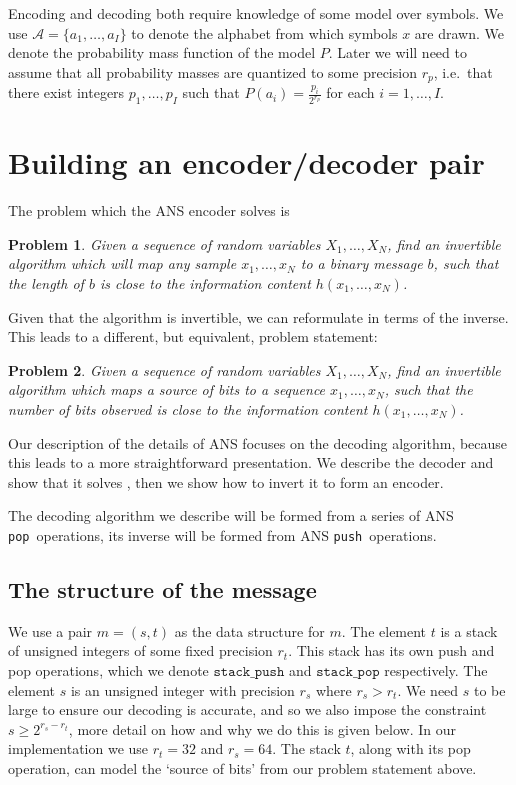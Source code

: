 \documentclass{article}
\newtheorem{problem}{Problem}
\newcommand{\push}{\texttt{push}}
\newcommand{\pop}{\texttt{pop}}
\begin{document}
Encoding and decoding both require knowledge of some model over symbols. We use
$\mathcal{A} = \{a_1, \ldots, a_I\}$ to denote the alphabet from which symbols
$x$ are drawn. We denote the probability mass function of the model $P$. Later
we will need to assume that all probability masses are quantized to some
precision $r_p$, i.e.\ that there exist integers $p_1, \ldots, p_I$ such that
$P(a_i) = \frac{p_i}{2^{r_p}}$ for each $i = 1,\ldots,I$.

\section{Building an encoder/decoder pair}
The problem which the ANS encoder solves is

\begin{problem}\label{prob:default}
  Given a sequence of random variables $X_1, \ldots, X_N$, find an invertible
  algorithm which will map any sample $x_1, \ldots, x_N$ to a binary message
  $b$, such that the length of $b$ is close to the information content $h(x_1,
  \ldots, x_N)$.
\end{problem}

Given that the algorithm is invertible, we can reformulate 
in terms of the inverse. This leads to a different, but equivalent, problem
statement:

\begin{problem}\label{prob:alt}
  Given a sequence of random variables $X_1, \ldots, X_N$, find an invertible
  algorithm which maps a source of bits to a sequence $x_1, \ldots, x_N$, such
  that the number of bits observed is close to the information content $h(x_1,
  \ldots, x_N)$.
\end{problem}

Our description of the details of ANS focuses on the decoding algorithm,
because this leads to a more straightforward presentation. We describe the
decoder and show that it solves , then we show how to invert it
to form an encoder.

The decoding algorithm we describe will be formed from a series of ANS \pop\
operations, its inverse will be formed from ANS \push\ operations.

\subsection{The structure of the message}\label{sec:message}
We use a pair $m = (s, t)$ as the data structure for $m$. The element $t$ is a
stack of unsigned integers of some fixed precision $r_t$. This stack has its
own push and pop operations, which we denote $\texttt{stack\_push}$ and
$\texttt{stack\_pop}$ respectively. The element $s$ is an unsigned integer with
precision $r_s$ where $r_s > r_t$. We need $s$ to be large to ensure our
decoding is accurate, and so we also impose the constraint $s\geq2^{r_s -
r_t}$, more detail on how and why we do this is given below. In our
implementation we use $r_t = 32$ and $r_s = 64$. The stack $t$, along with its
pop operation, can model the `source of bits' from our problem statement above.
\end{document}
